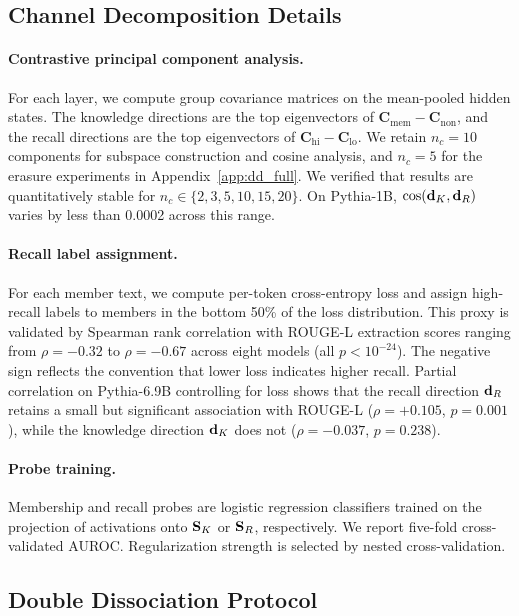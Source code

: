 \subsection{Channel Decomposition Details}
\label{app:bcd_details}

\paragraph{Contrastive principal component analysis.}
For each layer, we compute group covariance matrices on the mean-pooled hidden states.
The knowledge directions are the top eigenvectors of $\mathbf{C}_{\text{mem}} - \mathbf{C}_{\text{non}}$, and the recall directions are the top eigenvectors of $\mathbf{C}_{\text{hi}} - \mathbf{C}_{\text{lo}}$.
We retain $n_c = 10$ components for subspace construction and cosine analysis, and $n_c = 5$ for the erasure experiments in Appendix~\ref{app:dd_full}.
We verified that results are quantitatively stable for $n_c \in \{2, 3, 5, 10, 15, 20\}$. On Pythia-1B, $\cos(\mathbf{d}_K, \mathbf{d}_R)$ varies by less than 0.0002 across this range.

\paragraph{Recall label assignment.}
For each member text, we compute per-token cross-entropy loss and assign high-recall labels to members in the bottom 50\% of the loss distribution.
This proxy is validated by Spearman rank correlation with ROUGE-L extraction scores ranging from $\rho = -0.32$ to $\rho = -0.67$ across eight models (all $p < 10^{-24}$).
The negative sign reflects the convention that lower loss indicates higher recall.
Partial correlation on Pythia-6.9B controlling for loss shows that the recall direction $\mathbf{d}_R$ retains a small but significant association with ROUGE-L ($\rho = +0.105$, $p = 0.001$), while the knowledge direction $\mathbf{d}_K$ does not ($\rho = -0.037$, $p = 0.238$).

\paragraph{Probe training.}
Membership and recall probes are logistic regression classifiers trained on the projection of activations onto $\mathbf{S}_K$ or $\mathbf{S}_R$, respectively.
We report five-fold cross-validated AUROC.
Regularization strength is selected by nested cross-validation.

\subsection{Double Dissociation Protocol}
\label{app:dd_details}

